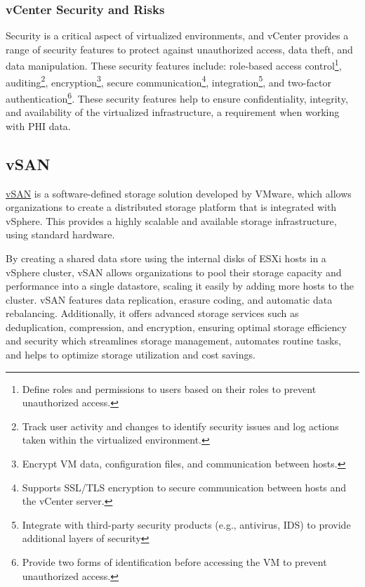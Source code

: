 \subsubsection{vCenter Security and Risks}
Security is a critical aspect of virtualized environments, and vCenter provides a range of security features to protect against unauthorized access, data theft, and data manipulation. These security features include: role-based access control\footnote{Define roles and permissions to users based on their roles to prevent unauthorized access.}, auditing\footnote{Track user activity and changes to identify security issues and log actions taken within the virtualized environment.}, encryption\footnote{Encrypt VM data, configuration files, and communication between hosts.}, secure communication\footnote{Supports SSL/TLS encryption to secure communication between hosts and the vCenter server.}, integration\footnote{Integrate with third-party security products (e.g., antivirus, IDS) to provide additional layers of security}, and two-factor authentication\footnote{Provide two forms of identification before accessing the VM to prevent unauthorized access.}. These security features help to ensure confidentiality, integrity, and availability of the virtualized infrastructure, a requirement when working with PHI data. 

\subsection{vSAN}
\href{https://docs.vmware.com/en/VMware-vSphere/7.0/com.vmware.vsphere.vsan-planning.doc/GUID-A80526C8-A941-4F84-9D44-D4B8B3914A95.html}{vSAN} is a software-defined storage solution developed by VMware, which allows organizations to create a distributed storage platform that is integrated with vSphere. This provides a highly scalable and available storage infrastructure, using standard hardware.

By creating a shared data store using the internal disks of ESXi hosts in a vSphere cluster, vSAN allows organizations to pool their storage capacity and performance into a single datastore, scaling it easily by adding more hosts to the cluster. vSAN features data replication, erasure coding, and automatic data rebalancing. Additionally, it offers advanced storage services such as deduplication, compression, and encryption, ensuring optimal storage efficiency and security which streamlines storage management, automates routine tasks, and helps to optimize storage utilization and cost savings.

